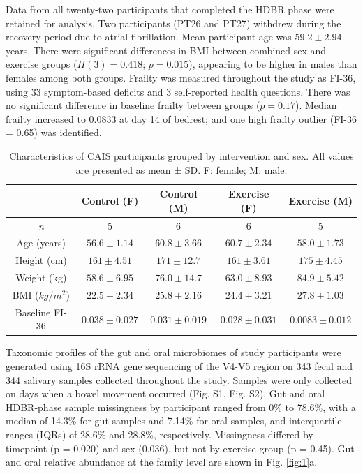 \documentclass[preprint,12pt,authoryear]{elsarticle}
\begin{document}
    Data from all twenty-two participants that completed the HDBR phase were retained for analysis. Two participants (PT26 and PT27) withdrew during the recovery period due to atrial fibrillation. Mean participant age was $59.2 \pm 2.94$ years. There were significant differences in BMI between combined sex and exercise groups ($H(3) = 0.418$; $p = 0.015$), appearing to be higher in males than females among both groups. Frailty was measured throughout the study as FI-36, using 33 symptom-based deficits and 3 self-reported health questions. There was no significant difference in baseline frailty between groups ($p = 0.17$). Median frailty increased to 0.0833 at day 14 of bedrest; and one high frailty outlier (FI-36 = 0.65) was identified.

\begin{table}[h]
    \centering
    \begin{tabular}{c c c c c}
        & \textbf{Control (F)} & \textbf{Control (M)} & \textbf{Exercise (F)} & \textbf{Exercise (M)} \\\hline
        \textit{n} & 5 & 6 & 6 & 5 \\
        Age (years) & $56.6 \pm 1.14$ & $60.8 \pm 3.66$ & $60.7 \pm 2.34$ & $58.0 \pm 1.73$ \\
        Height (cm) & $161 \pm 4.51$ & $171 \pm 12.7$ & $161 \pm 3.61$ & $175 \pm 4.45$ \\
        Weight (kg) & $58.6 \pm 6.95$ & $76.0 \pm 14.7$ & $63.0 \pm 8.93$ & $84.9 \pm 5.42$ \\
        BMI ($kg/m^2$) & $22.5 \pm 2.34$ & $25.8 \pm 2.16$ & $24.4 \pm 3.21$ & $27.8 \pm 1.03$ \\
        Baseline FI-36 & $0.038 \pm 0.027$ & $0.031 \pm 0.019$ & $0.028 \pm 0.031$ & $0.0083 \pm 0.012$ \\
    \end{tabular}
    \caption{Characteristics of CAIS participants grouped by intervention and sex. All values are presented as mean ± SD. F: female; M: male.}\label{table1}
\end{table}

    Taxonomic profiles of the gut and oral microbiomes of study participants were generated using 16S rRNA gene sequencing of the V4-V5 region on 343 fecal and 344 salivary samples collected throughout the study. Samples were only collected on days when a bowel movement occurred (Fig. S1, Fig. S2). Gut and oral HDBR-phase sample missingness by participant ranged from 0\% to 78.6\%, with a median of 14.3\% for gut samples and 7.14\% for oral samples, and interquartile ranges (IQRs) of 28.6\% and 28.8\%, respectively. Missingness differed by timepoint (p = 0.020) and sex (0.036), but not by exercise group (p = 0.45). Gut and oral relative abundance at the family level are shown in Fig. \ref{fig:1}a.
\end{document}
